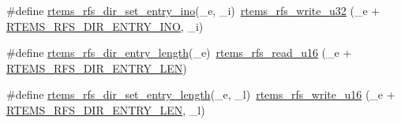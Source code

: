 \begin{DoxyCompactItemize}
\item 
\#define \mbox{\hyperlink{rtems-rfs-dir_8h_a2f5bd944867371a12678c287ada2683a}{rtems\+\_\+rfs\+\_\+dir\+\_\+set\+\_\+entry\+\_\+ino}}(\+\_\+e,  \+\_\+i)~\mbox{\hyperlink{rtems-rfs-data_8h_a0e7b57b15dac03868caaeb7d2c8c1ba7}{rtems\+\_\+rfs\+\_\+write\+\_\+u32}} (\+\_\+e + \mbox{\hyperlink{rtems-rfs-dir_8h_a0b52d37896f9be61b9946bc726aecd4d}{R\+T\+E\+M\+S\+\_\+\+R\+F\+S\+\_\+\+D\+I\+R\+\_\+\+E\+N\+T\+R\+Y\+\_\+\+I\+NO}}, \+\_\+i)
\item 
\#define \mbox{\hyperlink{rtems-rfs-dir_8h_a33fdddc3d6b082731e449cb18d008264}{rtems\+\_\+rfs\+\_\+dir\+\_\+entry\+\_\+length}}(\+\_\+e)~\mbox{\hyperlink{rtems-rfs-data_8h_a602400ac127a6614ac1e16f322df3f0b}{rtems\+\_\+rfs\+\_\+read\+\_\+u16}} (\+\_\+e + \mbox{\hyperlink{rtems-rfs-dir_8h_ab32ed76f1463d9de333a986fd2290f8f}{R\+T\+E\+M\+S\+\_\+\+R\+F\+S\+\_\+\+D\+I\+R\+\_\+\+E\+N\+T\+R\+Y\+\_\+\+L\+EN}})
\item 
\#define \mbox{\hyperlink{rtems-rfs-dir_8h_a55dd971fb074640f99b5368125cc2814}{rtems\+\_\+rfs\+\_\+dir\+\_\+set\+\_\+entry\+\_\+length}}(\+\_\+e,  \+\_\+l)~\mbox{\hyperlink{rtems-rfs-data_8h_a7f9da284acf36ff50739fd3fd252f210}{rtems\+\_\+rfs\+\_\+write\+\_\+u16}} (\+\_\+e + \mbox{\hyperlink{rtems-rfs-dir_8h_ab32ed76f1463d9de333a986fd2290f8f}{R\+T\+E\+M\+S\+\_\+\+R\+F\+S\+\_\+\+D\+I\+R\+\_\+\+E\+N\+T\+R\+Y\+\_\+\+L\+EN}}, \+\_\+l)
\end{DoxyCompactItemize}
